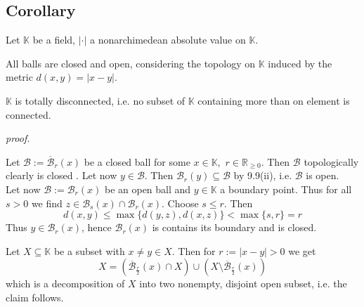 \documentclass[12pt]{book}
\begin{document}
\begin{spacing}{1.3}
\subsection{Corollary}%
Let $\mathbb{K}$ be a field, $|\cdot|$ a nonarchimedean absolute value on $\mathbb{K}$.
\begin{compactenum}
\item All balls are closed and open, considering the topology on $\mathbb{K}$ induced by the metric $d(x,y)=|x-y|$.
\item $\mathbb{K}$ is totally disconnected, i.e. no subset of $\mathbb{K}$ containing more than on element is connected.
\end{compactenum}
\textit{proof.}
\begin{compactenum}
\item Let $\mathcal{B}:= \overline{\mathcal{B}}_r(x)$ be a closed ball for some $x \in \mathbb{K},$ $r \in \mathbb{R}_{\geqslant 0}$. Then $\mathcal{B}$ topologically clearly is  closed . Let now $y \in \mathcal{B}$. Then $\mathcal{B}_r(y) \subseteq \mathcal{B}$ by 9.9(ii), i.e. $\mathcal{B}$ is open.\\
Let now $\mathcal{B}:=\mathcal{B}_r(x)$ be an open ball and $y \in \mathbb{K}$ a boundary point. Thus for all $s>0$ we find $z \in \mathcal{B}_{s}(x) \cap \mathcal{B}_r(x)$. Choose $s \leqslant r$. Then 
$$d(x,y)\leqslant \max\{d(y,z), d(x,z)\} < \max\{s,r\}=r$$
Thus $y \in \mathcal{B}_r(x)$, hence $\mathcal{B}_r(x)$ is contains its boundary and is closed.
\item Let $X \subseteq \mathbb{K}$ be a subset with $x \neq y \in X$. Then for $r:= |x-y| >0$ we get
$$X=\left(\overline{\mathcal{B}}_{\frac{r}{2}}(x) \cap X\right) \cup \left(X \setminus \overline{\mathcal{B}}_{\frac{r}{2}}(x)\right)$$
which is a decomposition of $X$ into two nonempty, disjoint open subset, i.e. the claim follows.
\end{compactenum}


\end{spacing}
\end{document}
